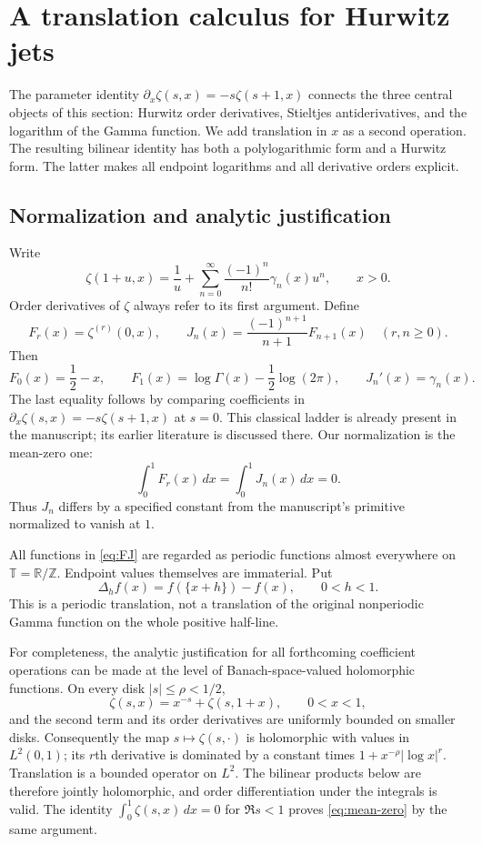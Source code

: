 \section{A translation calculus for Hurwitz jets}
\label{sec:translation}

The parameter identity $\partial_x\zeta(s,x)=-s\zeta(s+1,x)$
connects the three central objects of this section: Hurwitz order derivatives,
Stieltjes antiderivatives, and the logarithm of the Gamma function.
We add translation in $x$ as a second operation. The resulting bilinear
identity has both a polylogarithmic form and a Hurwitz form. The latter
makes all endpoint logarithms and all derivative orders explicit.

\subsection{Normalization and analytic justification}

Write
\begin{equation}\label{eq:stieltjes-def}
 \zeta(1+u,x)=\frac1u+\sum_{n=0}^{\infty}
              \frac{(-1)^n}{n!}\gamma_n(x)u^n,
 \qquad x>0.
\end{equation}
Order derivatives of $\zeta$ always refer to its first argument. Define
\begin{equation}\label{eq:FJ}
 F_r(x)=\zeta^{(r)}(0,x),\qquad
 J_n(x)=\frac{(-1)^{n+1}}{n+1}F_{n+1}(x)
 \quad(r,n\geq0).
\end{equation}
Then
\[
 F_0(x)=\frac12-x,\qquad
 F_1(x)=\log\Gamma(x)-\frac12\log(2\pi),\qquad J_n'(x)=\gamma_n(x).
\]
The last equality follows by comparing coefficients in
$\partial_x\zeta(s,x)=-s\zeta(s+1,x)$ at $s=0$. This classical ladder is
already present in the manuscript; its earlier literature is discussed
there. Our normalization is the mean-zero one:
\begin{equation}\label{eq:mean-zero}
 \int_0^1F_r(x)\,dx=\int_0^1J_n(x)\,dx=0.
\end{equation}
Thus $J_n$ differs by a specified constant from the manuscript's primitive
normalized to vanish at $1$.

All functions in \eqref{eq:FJ} are regarded as periodic functions almost
everywhere on $\mathbb T=\mathbb R/\mathbb Z$. Endpoint values themselves
are immaterial. Put
\[
 \Delta_hf(x)=f(\{x+h\})-f(x),\qquad 0<h<1.
\]
This is a periodic translation, not a translation of the original
nonperiodic Gamma function on the whole positive half-line.

For completeness, the analytic justification for all forthcoming
coefficient operations can be made at the level of Banach-space-valued
holomorphic functions. On every disk $|s|\leq\rho<1/2$,
\[
 \zeta(s,x)=x^{-s}+\zeta(s,1+x),\qquad 0<x<1,
\]
and the second term and its order derivatives are uniformly bounded on
smaller disks. Consequently the map $s\mapsto\zeta(s,\cdot)$ is
holomorphic with values in $L^2(0,1)$; its $r$th derivative is dominated
by a constant times $1+x^{-\rho}|\log x|^r$. Translation is a bounded
operator on $L^2$. The bilinear products below are therefore jointly
holomorphic, and order differentiation under the integrals is valid.
The identity $\int_0^1\zeta(s,x)\,dx=0$ for $\Re s<1$ proves
\eqref{eq:mean-zero} by the same argument.

